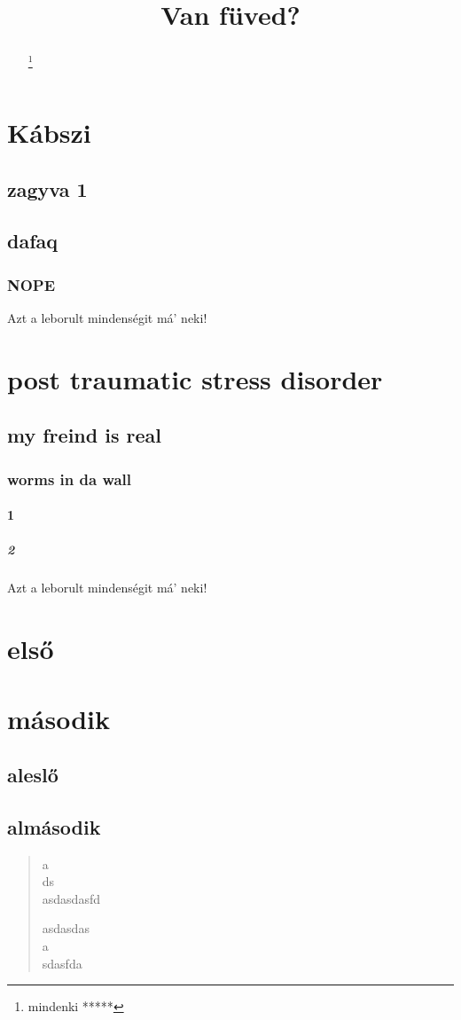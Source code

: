 \documentclass[twocolumn]{article}
\title{Van füved?}
\begin{document}
\maketitle
\begin{abstract}
\texttt{\lipsum[3-4]}
\renewcommand{\thefootnote}{\fnsymbol{footnote}}
\footnote{mindenki *****}
\end{abstract}
\setcounter{secnumdepth}{10}
\setcounter{tocdepth}{10}
\renewcommand{\contentsname}{MI FOLYIK ITT GYÖNGYÖSÖN!?}
\tableofcontents
\clearpage
{}
\section{Kábszi}
\subsection{zagyva 1}
\hulipsum[3]
\subsection{dafaq}
\hulipsum[4]
\subsubsection{NOPE}
\hulipsum[1]
\marginparwidth 3cm
\marginparsep 0.5cm
Azt a leborult mindenségit má' neki!
\section[ptsd]{post traumatic stress disorder}
\subsection{my freind is real}
\subsubsection{worms in da wall}
\paragraph{1}
\subparagraph{2}
\marginparwidth 3cm
\marginparsep 0.5cm
Azt a leborult mindenségit má' neki!
\hulipsum[2]
\quote
\lipsum[5-6]
\quotation
\hulipsum[6-7]
\tableofcontents
\appendix
\section{első}
\section{második}
\subsection{aleslő}
\subsection{almásodik}
\begin{verse}
a\\
ds\\
asdasdasfd

asdasdas\\
a\\
sdasfda
\end{verse}
\end{document}
